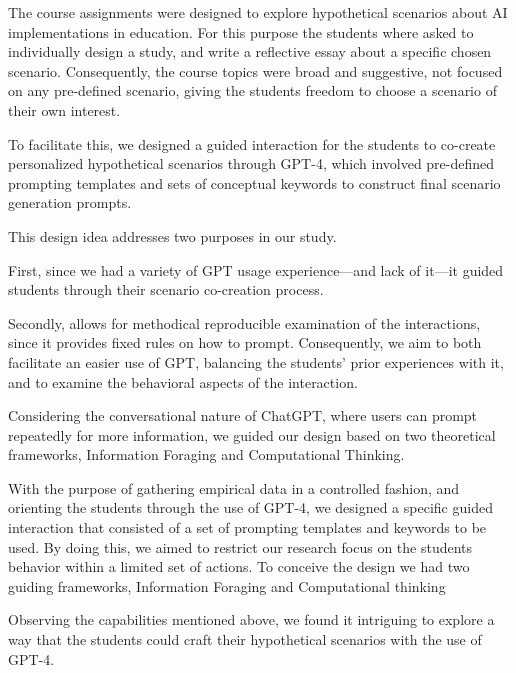 \documentclass[sn-mathphys, Numbered]{sn-jnl}%
\theoremstyle{thmstyleone}%
\theoremstyle{thmstyletwo}%
\theoremstyle{thmstylethree}%
\begin{document}
The course assignments were designed to explore hypothetical scenarios about AI implementations in education. For this purpose the students where asked to individually design a study, and write a reflective essay about a specific chosen scenario. Consequently, the course topics were broad and suggestive, not focused on any pre-defined scenario, giving the students freedom to choose a scenario of their own interest. 

To facilitate this, we designed a guided interaction for the students to co-create personalized hypothetical scenarios through GPT-4, which involved  pre-defined prompting templates and sets of conceptual keywords to construct final scenario generation prompts.

This design idea addresses two purposes in our study. 

First, since we had a variety of GPT usage experience---and lack of it---it guided students through their scenario co-creation process. 

Secondly, allows for methodical reproducible examination of the interactions, since it provides fixed rules on how to prompt. Consequently, we aim to both facilitate an easier use of GPT, balancing the students' prior experiences with it, and to examine the behavioral aspects of the interaction. 

Considering the conversational nature of ChatGPT, where users can prompt repeatedly for more information, we guided our design based on two theoretical frameworks, Information Foraging and Computational Thinking.




With the purpose of gathering empirical data in a controlled fashion, and orienting the students through the use of GPT-4, we designed a specific guided interaction that consisted of a set of prompting templates and keywords to be used. By doing this, we aimed to restrict our research focus on the students behavior within a limited set of actions. To conceive the design we had two guiding frameworks, Information Foraging and Computational thinking



Observing the capabilities mentioned above, we found it intriguing to explore a way that the students could craft their hypothetical scenarios with the use of GPT-4. 
\end{document}
